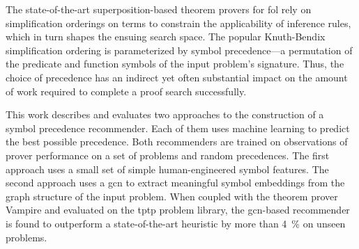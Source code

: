 The state-of-the-art superposition-based theorem provers for \acrlong{fol} rely on simplification orderings on terms to constrain the applicability of inference rules,
which in turn shapes the ensuing search space.
The popular Knuth-Bendix simplification ordering is parameterized by symbol precedence---a permutation of the predicate and function symbols of the input problem’s signature.
Thus, the choice of precedence has an indirect yet often substantial impact on the amount of work required to complete a proof search successfully.

This work describes and evaluates two approaches to the construction of a symbol precedence recommender.
Each of them uses machine learning to predict the best possible precedence.
Both recommenders are trained on observations of prover performance on a set of problems and random precedences.
The first approach uses a small set of simple human-engineered symbol features.
The second approach uses a \acrfull{gcn} to extract meaningful symbol embeddings from the graph structure of the input problem.
When coupled with the theorem prover Vampire and evaluated on the \acrshort{tptp} problem library, the \acrshort{gcn}-based recommender is found to outperform a state-of-the-art heuristic by more than \SI{4}{\percent} on unseen problems.
